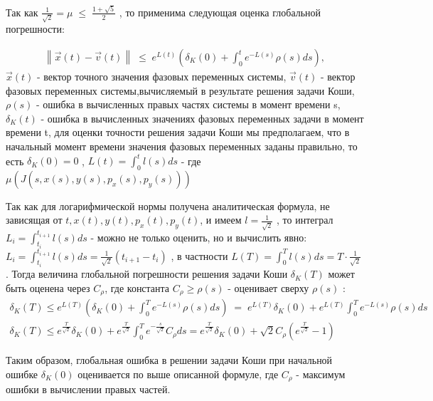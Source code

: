 \documentclass[a4paper,12pt]{article}
\begin{document}
Так как $\frac{1}{\sqrt{2}}=\mu \;\leqslant\; \frac{1+\sqrt{5}}{2}$ , то применима следующая оценка глобальной погрешности:

\begin{align*}
    \left\| \vec{x}(t)-\vec{v}(t)\right\| \;\leqslant\; e^{L(t)} \left(\delta_K(0)+\int_0^t e^{-L(s)}\rho(s)ds\right), 
\end{align*}
$\vec{x}(t)$ - вектор точного значения фазовых переменных системы,\newline
$\vec{v}(t)$ - вектор фазовых переменных системы,вычисляемый в результате решения задачи Коши,\newline
$\rho(s)$ - ошибка в вычисленных правых частях системы в момент времени s,\newline
$\delta_K(t)$ - ошибка в вычисленных значениях фазовых переменных задачи в момент времени t, для оценки точности решения задачи Коши мы предполагаем, что в начальный момент времени значения фазовых переменных заданы правильно, то есть $\delta_K(0)=0$ ,\newline
$L(t)=\int_0^t l(s)ds$ - где $\mu(J(s,x(s),y(s),p_x(s),p_y(s)))$

Так как для логарифмической нормы получена аналитическая формула, не зависящая от $t,x(t),y(t),p_x(t),p_y(t)$, и имеем $l=\frac{1}{\sqrt{2}}$ , то интеграл $L_i=\int_{t_i}^{t_{i+1}}l(s)ds$ - можно не только оценить, но и вычислить явно: $L_i=\int_{t_i}^{t_{i+1}}l(s)ds=\frac{1}{\sqrt{2}}(t_{i+1}-t_i)$ , в частности $L(T)=\int_0^Tl(s)ds=T\cdot\frac{1}{\sqrt{2}}$. Тогда величина глобальной погрешности решения задачи Коши $\delta_K(T)$ может быть оценена через $C_{\rho}$, где константа $C_{\rho}\geqslant \rho(s)$ - оценивает сверху $\rho(s)$ :
\begin{align*}
    \delta_K(T) \leqslant e^{L(T)}\left(\delta_K(0)+\int_0^Te^{-L(s)}\rho(s)ds\right) \;=\; e^{L(T)}\delta_K(0)+e^{L(T)}\int_0^Te^{-L(s)}\rho(s)ds
    \\
    \delta_K(T) \leqslant e^{\frac{T}{\sqrt{2}}}\delta_K(0)+e^{\frac{T}{\sqrt{2}}}\int_0^Te^{-\frac{s}{\sqrt{2}}}C_{\rho}ds=e^{\frac{T}{\sqrt{2}}}\delta_K(0)+\sqrt{2} C_{\rho} \left(e^{\frac{T}{\sqrt{2}}}-1\right)
\end{align*}

Таким образом, глобальная ошибка в решении задачи Коши при начальной ошибке $\delta_K(0)$ оценивается по выше описанной формуле, где $C_{\rho}$ - максимум ошибки в вычислении правых частей.
\end{document}
